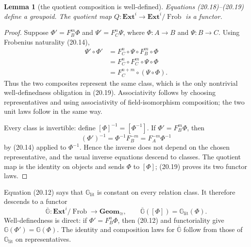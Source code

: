 \documentclass[11pt,oneside]{article}
\newtheorem{lemma}[theorem]{Lemma}
\theoremstyle{definition}
\theoremstyle{remark}
\newcommand{\Frob}{\operatorname{Frob}}
\begin{document}
\begin{lemma}[the quotient composition is well-defined]
Equations (20.18)--(20.19) define a groupoid.  The quotient map
$Q:\mathbf{Ext}^{i}\to\mathbf{Ext}^{i}/\Frob$ is a functor.
\end{lemma}
\begin{proof}
Suppose $\Phi'=F_B^m\Phi$ and $\Psi'=F_C^n\Psi$, where
$\Phi:A\to B$ and $\Psi:B\to C$.  Using Frobenius naturality (20.14),
\[
\begin{aligned}
 \Psi'\circ\Phi'
 &=F_C^n\circ\Psi\circ F_B^m\circ\Phi\\
 &=F_C^n\circ F_C^m\circ\Psi\circ\Phi\\
 &=F_C^{n+m}\circ(\Psi\circ\Phi).
\end{aligned}                                                   \tag{20.20}
\]
Thus the two composites represent the same class, which is the only nontrivial
well-definedness obligation in (20.19).  Associativity follows by choosing
representatives and using associativity of field-isomorphism composition; the two unit
laws follow in the same way.

Every class is invertible: define $[\Phi]^{-1}=[\Phi^{-1}]$.  If
$\Phi'=F_B^m\Phi$, then
\[
 (\Phi')^{-1}=\Phi^{-1}F_B^{-m}=F_A^{-m}\Phi^{-1}             \tag{20.21}
\]
by (20.14) applied to $\Phi^{-1}$.  Hence the inverse does not depend on the chosen
representative, and the usual inverse equations descend to classes.  The quotient map is
the identity on objects and sends $\Phi$ to $[\Phi]$; (20.19) proves its two functor laws.
\end{proof}

Equation (20.12) says that $\mathbb G_{\mathrm{lit}}$ is constant on every relation class.
It therefore descends to a functor
\[
 \overline{\mathbb G}:\mathbf{Ext}^{i}/\Frob
              \longrightarrow\mathbf{Geom}_{\cong},\qquad
 \overline{\mathbb G}([\Phi])=\mathbb G_{\mathrm{lit}}(\Phi). \tag{20.22}
\]
Well-definedness is direct: if $\Phi'=F_B^n\Phi$, then (20.12) and functoriality give
$\mathbb G(\Phi')=\mathbb G(\Phi)$.  The identity and composition laws for
$\overline{\mathbb G}$ follow from those of $\mathbb G_{\mathrm{lit}}$ on representatives.
\end{document}
